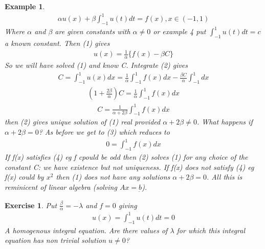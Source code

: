 \documentclass[10pt, oneside]{article}
\newtheorem{example}{Example}
\newtheorem{exe}{Exercise}
\begin{document}
\begin{example}
    \begin{align}
        \alpha u(x) + \beta \int_{-1}^{1} u(t) dt = f(x), x \in (-1,1)
    \end{align}
    Where $\alpha$ and $\beta$ are given constants with $\alpha \neq 0$ or example 4 put $\int_{-1}^{1} u(t) dt = c$ a known constant. Then (1) gives
    \begin{align}
        u(x) = \frac{1}{\alpha} \{f(x) - \beta C\}
    \end{align}
    So we will have solved (1) and know C. Integrate (2) gives
    \begin{align*}
        C = \int_{-1}^{1} u(x) dx = \frac{1}{\alpha} \int_{-1}^{1} f(x)dx - \frac{\beta C}{\alpha}\int_{-1}^{1} dx
    \end{align*}
    \begin{align}
        (1+\frac{2\beta}{\alpha})C = \frac{1}{\alpha}\int_{-1}^{1} f(x)dx
    \end{align}
    \begin{align*}
        C = \frac{1}{\alpha + 2\beta}\int_{-1}^{1} f(x) dx
    \end{align*}
    then (2) gives unique solution of (1) real provided $\alpha + 2 \beta \neq 0$. What happens if $\alpha + 2\beta =0 $? As before we get to (3) which reduces to 
    \begin{align}
        0 = \int_{-1}^{1} f(x) dx
    \end{align}
    If f(x) satisfies (4) eg f cpould be odd then (2) solves (1) for any choice of the constant C: we have existence but not uniqueness. If f(x) does not satisfy (4) eg f(x) could by $x^{2}$ then (1) does not have any solutions $\alpha + 2\beta=0$. All this is reminicent of linear algebra (solving $Ax=\underset{\tilde{}}{b}$).
\end{example}
\begin{exe}
    Put $\frac{\beta}{\alpha}=-\lambda$ and $f=0$ giving
    \begin{align*}
        u(x) = \int_{-1}^{1} u(t) dt = 0
    \end{align*}
    A homogenous integral equation. Are there values of $\lambda$ for which this integral equation has non trivial solution $u\neq 0$?
\end{exe}
\end{document}
